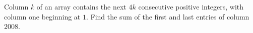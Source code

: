 Column $k$ of an array contains the next $4k$ consecutive positive integers, with column one beginning at $1$. Find the sum of the first and last entries of column $2008$.
